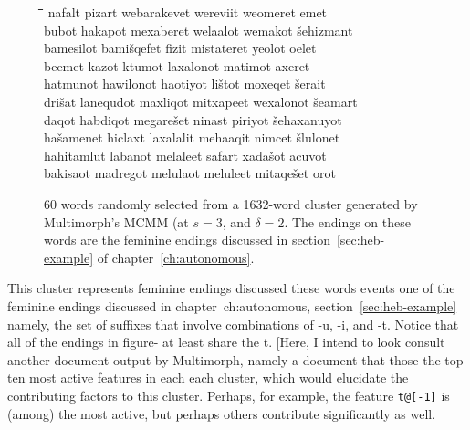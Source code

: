 \begin{figure}[ht]
\begin{tabbing}
\hspace*{14ex}\= \hspace*{14ex}\=\hspace*{14ex}\=\hspace*{14ex}\=\hspace*{14ex}\=\hspace*{14ex} \kill
nafalt \> pizart \> webarakevet \> wereviit \> weomeret \> emet\\
bubot \> hakapot \> mexaberet \> welaalot \> wemakot \>\v{s}ehizmant\\
bamesilot \> bami\v{s}qefet \> fizit \> mistateret \> yeolot \> oelet\\
beemet \> kazot \> ktumot \> laxalonot \> matimot \> axeret\\
hatmunot \> hawilonot \> haotiyot \> li\v{s}tot \> moxeqet \>\v{s}erait\\
dri\v{s}at \> lanequdot \> maxliqot \> mitxapeet \> wexalonot \>\v{s}eamart\\
daqot \> habdiqot \> megare\v{s}et \> ninast \> piriyot \>\v{s}ehaxanuyot\\
ha\v{s}amenet \> hiclaxt \> laxalalit \> mehaaqit \> nimcet \>\v{s}lulonet\\
hahitamlut \> labanot \> melaleet \> safart \> xada\v{s}ot \> acuvot\\
bakisaot \> madregot \> melulaot \> meluleet \> mitaqe\v{s}et \> orot
\end{tabbing}
\caption{60 words randomly selected from a 1632-word cluster generated by Multimorph's MCMM (at $s = 3$, and $\delta = 2$. The endings on these words are the feminine endings discussed in section~\ref{sec:heb-example} of chapter~\ref{ch:autonomous}.} %
\label{fig:cl-fem}
\end{figure}

This cluster represents feminine endings discussed these words events one of the feminine endings discussed in chapter~{ch:autonomous}, section~\ref{sec:heb-example} namely, the set of suffixes that involve combinations of {-u}, {-i}, and {-t}. Notice that all of the endings in figure- at least share the t. [Here, I intend to look consult another document output by Multimorph, namely a document that those the top ten most active features in each each cluster,
which would elucidate the contributing factors to this cluster. Perhaps, for example, the feature \texttt{t@[-1]} is (among) the most active, but perhaps others contribute significantly as well. 

